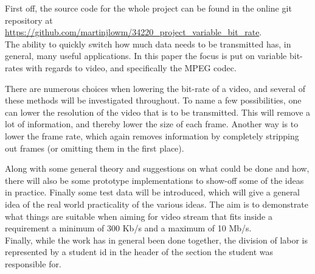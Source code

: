 First off, the source code for the whole project can be found in the online git repository at \url{https://github.com/martinjlowm/34220_project_variable_bit_rate}.\\

\noindent The ability to quickly switch how much data needs to be transmitted has, in general, many useful applications. In this paper the focus is put on variable bit-rates with regards to video, and specifically the MPEG codec.

There are numerous choices when lowering the bit-rate of a video, and several of these methods will be investigated throughout. To name a few possibilities, one can lower the resolution of the video that is to be transmitted. This will remove a lot of information, and thereby lower the size of each frame. Another way is to lower the frame rate, which again removes information by completely stripping out frames (or omitting them in the first place).

Along with some general theory and suggestions on what could be done and how, there will also be some prototype implementations to show-off some of the ideas in practice. Finally some test data will be introduced, which will give a general idea of the real world practicality of the various ideas. The aim is to demonstrate what things are suitable when aiming for video stream that fits inside a requirement a minimum of 300 Kb/s and a maximum of 10 Mb/s.\\

Finally, while the work has in general been done together, the division of labor is represented by a student id in the header of the section the student was responsible for.
